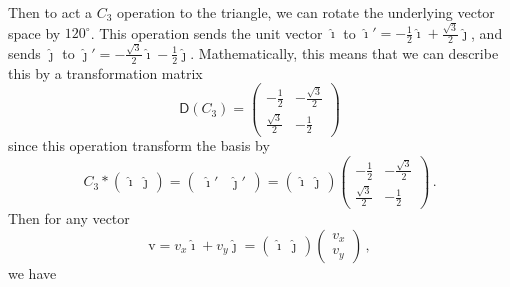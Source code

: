 \documentclass{article}
\theoremstyle{plain}\theoremheaderfont{\normalfont\itshape}\theorembodyfont{\rmfamily}\theoremseparator{.}\newtheorem*{rem}{Remark}\newtheorem*{ex}{Example}\newtheorem*{proof}{Proof}\newtheorem*{altp}{Alternative proof}
\theoremstyle{plain}\theoremheaderfont{\normalfont\bfseries}\theorembodyfont{\rmfamily}\theoremseparator{.}\newtheorem{thm}{Theorem}[section]\newtheorem{lem}[thm]{Lemma}\newtheorem{prop}[thm]{Proposition}\newtheorem*{cor}{Corollary}\newtheorem{defn}[thm]{Definition}\newtheorem{clm}[thm]{Claim}\newtheorem{clminproof}{Claim}\newtheorem*{law}{Law}\newtheorem{pos}[thm]{Postulate}
\theoremstyle{break}\theoremheaderfont{\normalfont\itshape}\theorembodyfont{\rmfamily}\theoremseparator{.\medskip}\newtheorem*{proofskip}{Proof}\newtheorem*{exs}{Examples}\newtheorem*{rems}{Remarks}
\theoremstyle{break}\theoremheaderfont{\normalfont\bfseries}\theorembodyfont{\rmfamily}\theoremseparator{.\medskip}\newtheorem{lemskip}[thm]{Lemma}\newtheorem{defnskip}[thm]{Definition}\newtheorem{propskip}[thm]{Proposition}\newtheorem{thmskip}[thm]{Theorem}
\numberwithin{equation}{section}
\newcommand{\vb}[1]{\bm{\mathrm{#1}}}
\newcommand{\vu}[1]{\hat{\bm{\mathrm{#1}}}}
\newcommand{\DD}{\mathsf{D}}
\begin{document}
    Then to act a \(C_3\) operation to the triangle, we can rotate the underlying vector space by \(120^\circ\). This operation sends the unit vector \(\vu{\imath}\) to \(\vu{\imath}'=-\frac{1}{2}\vu{\imath}+\frac{\sqrt{3}}{2}\vu{\jmath}\), and sends \(\vu{\jmath}\) to \(\vu{\jmath}'=-\frac{\sqrt{3}}{2}\vu{\imath}-\frac{1}{2}\vu{\jmath}\). Mathematically, this means that we can describe this by a transformation matrix
    \begin{equation}
        \DD(C_3)=\begin{pmatrix}
            -\frac{1}{2} & -\frac{\sqrt{3}}{2} \\
            \frac{\sqrt{3}}{2} & -\frac{1}{2}
        \end{pmatrix}
    \end{equation}
    since this operation transform the basis by
    \begin{equation}
        C_3*\begin{pmatrix}
            \vu{\imath} & \vu{\jmath}
        \end{pmatrix}=\begin{pmatrix}
            \vu{\imath}' & \vu{\jmath}'
        \end{pmatrix}=\begin{pmatrix}
            \vu{\imath} & \vu{\jmath}
        \end{pmatrix}\begin{pmatrix}
            -\frac{1}{2} & -\frac{\sqrt{3}}{2} \\
            \frac{\sqrt{3}}{2} & -\frac{1}{2}
        \end{pmatrix}\,.
    \end{equation}
    Then for any vector
    \begin{equation}
        \vb{v}=v_x\vu{\imath}+v_y\vu{\jmath}=\begin{pmatrix}
            \vu{\imath} & \vu{\jmath}
        \end{pmatrix}\begin{pmatrix}
            v_x \\ v_y
        \end{pmatrix}\,,
    \end{equation}
    we have
\end{document}
